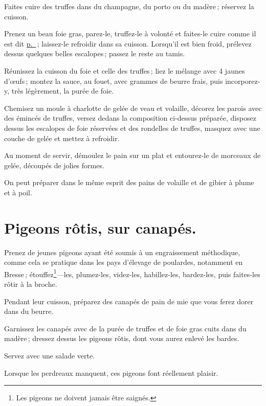 Faites cuire des truffes dans du champagne, du porto ou du madère ; réservez la
cuisson.

Prenez un beau foie gras, parez-le, truffez-le à volonté et faites-le cuire
comme il est dit \hyperlink{p0596}{p. \pageref{pg0596}} ; laissez-le refroidir dans sa cuisson.
Lorsqu'il est bien froid, prélevez dessus quelques belles escalopes ; passez le
reste au tamis.

Réunissez la cuisson du foie et celle des truffes ; liez le mélange avec
4 jaunes d'œufs ; montez la sauce, au fouet, avec {\mmm} grammes de
beurre frais, puis incorporez-y, très légèrement, la purée de foie.

Chemisez un moule à charlotte de gelée de veau et volaille, décorez les parois
avec des émincés de truffes, versez dedans la composition ci-dessus préparée,
disposez dessus les escalopes de foie réservées et des rondelles de truffes,
masquez avec une couche de gelée et mettez à refroidir.

Au moment de servir, démoulez le pain sur un plat et entourez-le de morceaux de
gelée, découpés de jolies formes.

\sk

On peut préparer dans le même esprit des pains de volaille et de gibier à plume
et à poil.

\section*{\centering Pigeons rôtis, sur canapés.}
{}

Prenez de jeunes pigeons ayant été soumis à un engraissement méthodique, comme
cela se pratique dans les pays d'élevage de poulardes, notamment en Bresse ;
étouffez\footnote{Les pigeons ne doivent jamais être saignés.}—les, plumez-les,
videz-les, habillez-les, bardez-les, puis faites-les rôtir à la broche.

Pendant leur cuisson, préparez des canapés de pain de mie que vous ferez dorer
dans du beurre.

Garnissez les canapés avec de la purée de truffes et de foie gras cuits dans du
madère ; dressez dessus les pigeons rôtis, dont vous aurez enlevé les bardes.

Servez avec une salade verte.

Lorsque les perdreaux manquent, ces pigeons font réellement plaisir.

